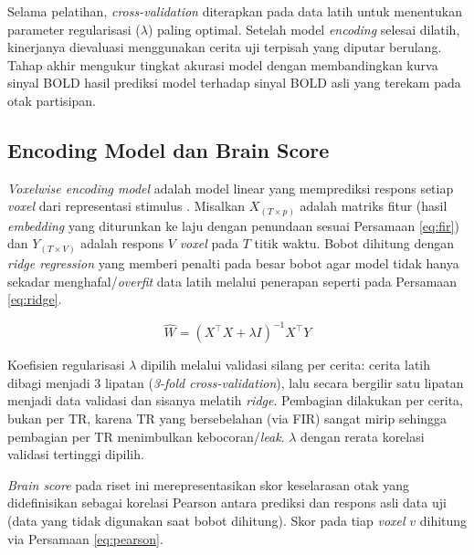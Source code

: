 Selama pelatihan, \textit{cross-validation} diterapkan pada data latih untuk menentukan parameter regularisasi ($\lambda$) paling optimal. Setelah model \textit{encoding} selesai dilatih, kinerjanya dievaluasi menggunakan cerita uji terpisah yang diputar berulang. Tahap akhir mengukur tingkat akurasi model dengan membandingkan kurva sinyal BOLD hasil prediksi model terhadap sinyal BOLD asli yang terekam pada otak partisipan.

 
 
\subsection{Encoding Model dan Brain Score}
\label{sub:sl_encoding}
 
\textit{Voxelwise encoding model} adalah model linear yang memprediksi respons setiap \textit{voxel} dari representasi stimulus \autocite{huth2016natural}. Misalkan $X_{(T \times p)}$ adalah matriks fitur (hasil \textit{embedding} yang diturunkan ke laju dengan penundaan sesuai Persamaan \ref{eq:fir}) dan $Y_{(T \times V)}$ adalah respons $V$ \textit{voxel} pada $T$ titik waktu. Bobot dihitung dengan \textit{ridge regression} yang memberi penalti pada besar bobot agar model tidak hanya sekadar menghafal/\textit{overfit} data latih melalui penerapan seperti pada Persamaan \ref{eq:ridge}.
 
\begin{equation}
  \hat{W} = \left(X^{\top}X + \lambda I\right)^{-1} X^{\top} Y
  \label{eq:ridge}
\end{equation}
 
Koefisien regularisasi $\lambda$ dipilih melalui validasi silang per cerita: cerita latih dibagi menjadi 3 lipatan (\textit{3-fold cross-validation}), lalu secara bergilir satu lipatan menjadi data validasi dan sisanya melatih \textit{ridge}. Pembagian dilakukan per cerita, bukan per TR, karena TR yang bersebelahan (via FIR) sangat mirip sehingga pembagian per TR menimbulkan kebocoran/\textit{leak}. $\lambda$ dengan rerata korelasi validasi tertinggi dipilih.

 
\textit{Brain score} pada riset ini merepresentasikan skor keselarasan otak yang didefinisikan sebagai korelasi Pearson antara prediksi dan respons asli data uji (data yang tidak digunakan saat bobot dihitung). Skor pada tiap \textit{voxel} $v$ dihitung via Persamaan \ref{eq:pearson}.
 
